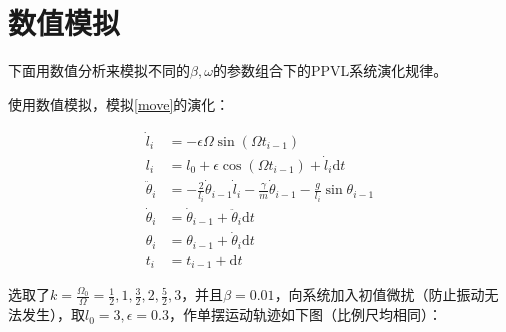 \section{数值模拟}

下面用数值分析来模拟不同的$\beta,\omega$的参数组合下的PPVL系统演化规律。

使用数值模拟，模拟\eqref{move}的演化：

\begin{align}
    \dot{l}_{i} &= -\epsilon\Omega\sin(\Omega t_{i-1}) \\
    l_{i} &= l_{0} + \epsilon\cos(\Omega t_{i-1})+\dot{l}_{i}\mathrm{d}t \\
    \ddot{\theta}_{i} &= -\frac{2}{l_{i}}\dot{\theta}_{i-1}\dot{l}_{i}-\frac{\gamma}{m}\dot{\theta}_{i-1}-\frac{g}{l_{i}}\sin\theta_{i-1} \\
    \dot{\theta}_{i} &= \dot{\theta}_{i-1}+\ddot{\theta}_{i}\mathrm{d}t \\
    \theta_{i} &= \theta_{i-1}+\dot{\theta}_{i}\mathrm{d}t \\
    t_{i} &= t_{i-1}+\mathrm{d}t
\end{align}

选取了$k=\frac{\Omega_{0}}{\Omega}=\frac{1}{2},1,\frac{3}{2},2,\frac{5}{2},3$，并且$\beta=0.01$，向系统加入初值微扰（防止振动无法发生），取$l_{0}=3,\epsilon=0.3$，作单摆运动轨迹如下图（比例尺均相同）：

